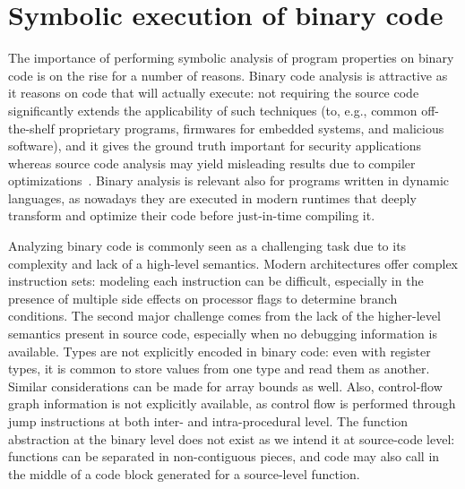 
\section{Symbolic execution of binary code}
\label{se:symbolic-binary}

The importance of performing symbolic analysis of program properties on binary code is on the rise for a number of reasons. Binary code analysis is attractive as it reasons on code that will actually execute: not requiring the source code significantly extends the applicability of such techniques (to, e.g., common off-the-shelf proprietary programs, firmwares for embedded systems, and malicious software), and it gives the ground truth important for security applications whereas source code analysis may yield misleading results due to compiler optimizations~\cite{BITBLAZE-ICISS08}. %
Binary analysis is relevant also for programs written in dynamic languages, as nowadays they are executed in modern runtimes that deeply transform and optimize their code before just-in-time compiling it.


Analyzing binary code is commonly seen as a challenging task due to its complexity and lack of a high-level semantics. Modern architectures offer complex instruction sets: modeling each instruction can be difficult, especially in the presence of multiple side effects on processor flags to determine branch conditions. The second major challenge comes from the lack of the higher-level semantics present in source code, especially when no debugging information is available. Types are not explicitly encoded in binary code: even with register types, it is common to store values from one type and read them as another. Similar considerations can be made for array bounds as well. Also, control-flow graph information is not explicitly available, as control flow is performed through jump instructions at both inter- and intra-procedural level. The function abstraction at the binary level does not exist as we intend it at source-code level: functions can be separated in non-contiguous pieces, and code may also call in the middle of a code block generated for a source-level function.

